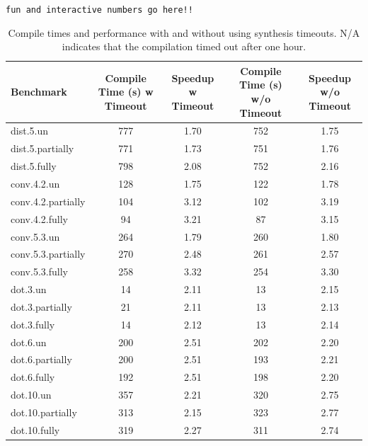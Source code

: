 \begin{table}
    {\tt fun and interactive numbers go here!!}
    \caption{Compile times and performance with and without using synthesis timeouts. N/A indicates that the compilation timed out after one hour.}\label{tab:ilp-ablation}
    \begin{tabular}{lcccc}
        \toprule
        Benchmark & Compile Time (s) w Timeout & Speedup w Timeout & Compile Time (s) w/o Timeout & Speedup w/o Timeout \\\midrule
        dist.5.un & 777 & 1.70 & 752 & 1.75 \\
        dist.5.partially & 771 & 1.73 & 751 & 1.76 \\
        dist.5.fully & 798 & 2.08 & 752 & 2.16 \\
        \midrule
        conv.4.2.un & 128 & 1.75 & 122 & 1.78 \\
        conv.4.2.partially & 104 & 3.12 & 102 & 3.19 \\
        conv.4.2.fully & 94 & 3.21 & 87 & 3.15 \\
        \midrule
        conv.5.3.un & 264 & 1.79 & 260 & 1.80 \\
        conv.5.3.partially & 270 & 2.48 & 261 & 2.57 \\
        conv.5.3.fully & 258 & 3.32 & 254 & 3.30 \\
        \midrule
        dot.3.un & 14 & 2.11 & 13 & 2.15 \\
        dot.3.partially & 21 & 2.11 & 13 & 2.13 \\
        dot.3.fully & 14 & 2.12 & 13 & 2.14 \\
        \midrule
        dot.6.un & 200 & 2.51 & 202 & 2.20 \\
        dot.6.partially & 200 & 2.51 & 193 & 2.21 \\
        dot.6.fully & 192 & 2.51 & 198 & 2.20 \\
        \midrule
        dot.10.un & 357 & 2.21 & 320 & 2.75 \\
        dot.10.partially & 313 & 2.15 & 323 & 2.77 \\
        dot.10.fully & 319 & 2.27 & 311 & 2.74 \\
        \bottomrule
    \end{tabular}
\end{table}



